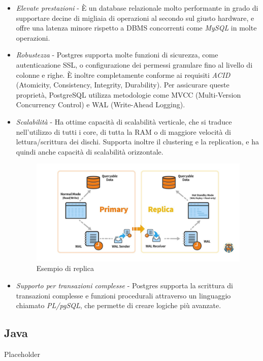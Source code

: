 \begin{itemize}
  \item \textit{Elevate prestazioni} - \`E un database relazionale molto performante in grado di supportare decine di migliaia di operazioni al secondo sul giusto hardware,
    e offre una latenza minore rispetto a DBMS concorrenti come \textit{MySQL} in molte operazioni.\cite{salunke2024performance}
  \item \textit{Robustezza} - Postgres supporta molte funzioni di sicurezza, come autenticazione SSL, o configurazione dei permessi granulare fino al
    livello di colonne e righe.
    \`E inoltre completamente conforme ai requisiti \textit{ACID} (Atomicity, Consistency, Integrity, Durability).
    Per assicurare queste propriet\`a, PostgreSQL utilizza metodologie come MVCC (Multi-Version Concurrency Control) e WAL (Write-Ahead Logging).
  \item \textit{Scalabilit\`a} - Ha ottime capacit\`a di scalabilit\`a verticale, che si traduce nell'utilizzo di tutti i core,
    di tutta la RAM o di maggiore velocit\`a di lettura/scrittura dei dischi.
    Supporta inoltre il clustering e la replication, e ha quindi anche capacit\`a di scalabilit\`a orizzontale.
    \begin{figure}[H]
      \centering
      \includegraphics[width=15cm]{images/postgres-replication.png}
      \caption{Esempio di replica\cite{postgreshighavail}}
    \end{figure}
  \item \textit{Supporto per transazioni complesse} - Postgres supporta la scrittura di transazioni complesse e funzioni procedurali attraverso un linguaggio chiamato
    \textit{PL/pgSQL}, che permette di creare logiche pi\`u avanzate.
\end{itemize}

\subsection{Java}
Placeholder
